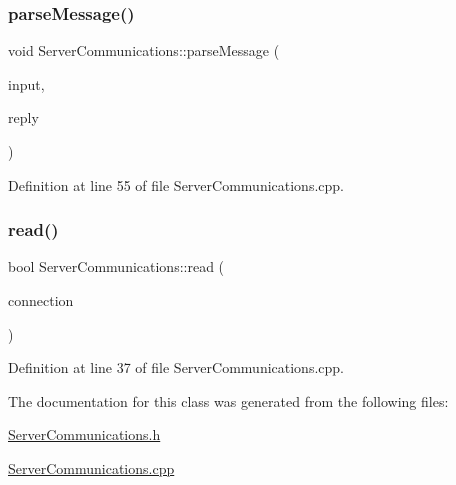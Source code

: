 \subsubsection{\texorpdfstring{parse\+Message()}{parseMessage()}}
{\footnotesize\ttfamily void Server\+Communications\+::parse\+Message (\begin{DoxyParamCaption}\item[{yarp\+::os\+::\+Bottle \&}]{input,  }\item[{yarp\+::os\+::\+Bottle \&}]{reply }\end{DoxyParamCaption})}



Definition at line 55 of file Server\+Communications.\+cpp.

\hypertarget{classocra__recipes_1_1ServerCommunications_a3a3430656af5150bb28b2012c3cd7004}{}\label{classocra__recipes_1_1ServerCommunications_a3a3430656af5150bb28b2012c3cd7004} 
\subsubsection{\texorpdfstring{read()}{read()}}
{\footnotesize\ttfamily bool Server\+Communications\+::read (\begin{DoxyParamCaption}\item[{yarp\+::os\+::\+Connection\+Reader \&}]{connection }\end{DoxyParamCaption})\hspace{0.3cm}{\ttfamily [virtual]}}



Definition at line 37 of file Server\+Communications.\+cpp.



The documentation for this class was generated from the following files\+:\begin{DoxyCompactItemize}
\item 
\hyperlink{ServerCommunications_8h}{Server\+Communications.\+h}\item 
\hyperlink{ServerCommunications_8cpp}{Server\+Communications.\+cpp}\end{DoxyCompactItemize}
